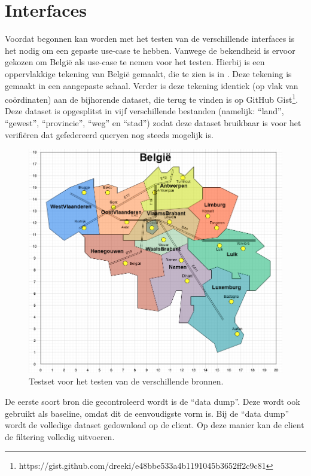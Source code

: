 \documentclass[twocolumn]{phdsymp} %
\begin{document}
\section{Interfaces}
Voordat begonnen kan worden met het testen van de verschillende interfaces is het nodig om een gepaste use-case te hebben. Vanwege de bekendheid is ervoor gekozen om België als use-case te nemen voor het testen. Hierbij is een oppervlakkige tekening van België gemaakt, die te zien is in . Deze tekening is gemaakt in een aangepaste schaal. Verder is deze tekening identiek (op vlak van coördinaten) aan de bijhorende dataset, die terug te vinden is op GitHub Gist\footnote{https://gist.github.com/dreeki/e48bbe533a4b1191045b3652ff2c9c81}. Deze dataset is opgesplitst in vijf verschillende bestanden (namelijk: ``land'', ``gewest'', ``provincie'', ``weg'' en ``stad'') zodat deze dataset bruikbaar is voor het verifiëren dat gefedereerd queryen nog steeds mogelijk is. 

\begin{figure}
    \centering
    \includegraphics[width=\linewidth]{images/geosparql_demo.png}
    \caption{Testset voor het testen van de verschillende bronnen.}
    \label{fig:abstr_demoset}
\end{figure}

De eerste soort bron die gecontroleerd wordt is de ``data dump''. Deze wordt ook gebruikt als baseline, omdat dit de eenvoudigste vorm is. Bij de ``data dump'' wordt de volledige dataset gedownload op de client. Op deze manier kan de client de filtering volledig uitvoeren. 
\end{document}
